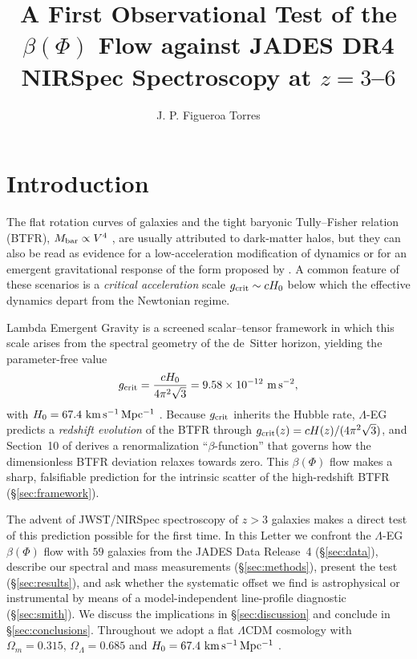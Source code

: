 \documentclass{rmxaa}
\title{A First Observational Test of the \LEG{} $\beta(\Phi)$ Flow
  against JADES DR4 NIRSpec Spectroscopy at $z=3$--$6$}
\author{J. P. Figueroa Torres\altaffilmark{1}}
\newcommand{\gcrit}{g_{\rm crit}}
\newcommand{\Mbar}{M_{\rm bar}}
\newcommand{\kms}{\ensuremath{\mathrm{km\,s^{-1}}}}
\newcommand{\LEG}{\mbox{$\Lambda$-EG}}
\begin{document}
\maketitle

\section{Introduction}
\label{sec:intro}

The flat rotation curves of galaxies and the tight baryonic
Tully--Fisher relation (BTFR), $\Mbar\propto V^4$
\citep{McGaugh2000,LelliBTFR2016}, are usually attributed to dark-matter
halos, but they can also be read as evidence for a low-acceleration
modification of dynamics \citep{Milgrom1983} or for an emergent
gravitational response of the form proposed by \citet{Verlinde2017}.
A common feature of these scenarios is a \emph{critical acceleration}
scale $\gcrit\sim cH_0$ below which the effective dynamics depart from
the Newtonian regime.

Lambda Emergent Gravity \citep[\LEG;][]{FigueroaTorres2026} is a screened
scalar--tensor framework in which this scale arises from the spectral
geometry of the de~Sitter horizon, yielding the parameter-free value
\begin{equation}
  \label{eq:gcrit}
  \gcrit=\frac{cH_0}{4\pi^2\sqrt{3}}=9.58\times10^{-12}\
  \mathrm{m\,s^{-2}},
\end{equation}
with $H_0=67.4\ \kms\,{\rm Mpc^{-1}}$ \citep{Planck2020}. Because
$\gcrit$ inherits the Hubble rate, \LEG{} predicts a \emph{redshift
  evolution} of the BTFR through $\gcrit(z)=cH(z)/(4\pi^2\sqrt{3})$,
and Section~10 of \citet{FigueroaTorres2026} derives a renormalization
``$\beta$-function'' that governs how the dimensionless BTFR deviation
relaxes towards zero. This $\beta(\Phi)$ flow makes a sharp, falsifiable
prediction for the intrinsic scatter of the high-redshift BTFR
(\S\ref{sec:framework}).

The advent of JWST/NIRSpec spectroscopy of $z>3$ galaxies makes a direct
test of this prediction possible for the first time. In this Letter we
confront the \LEG{} $\beta(\Phi)$ flow with $59$ galaxies from the JADES
Data Release~4 (\S\ref{sec:data}), describe our spectral and mass
measurements (\S\ref{sec:methods}), present the test
(\S\ref{sec:results}), and ask whether the systematic offset we find is
astrophysical or instrumental by means of a model-independent
line-profile diagnostic (\S\ref{sec:smith}). We discuss the
implications in \S\ref{sec:discussion} and conclude in
\S\ref{sec:conclusions}. Throughout we adopt a flat $\Lambda$CDM
cosmology with $\Omega_m=0.315$, $\Omega_\Lambda=0.685$ and
$H_0=67.4\ \kms\,{\rm Mpc^{-1}}$ \citep{Planck2020}.
\end{document}
